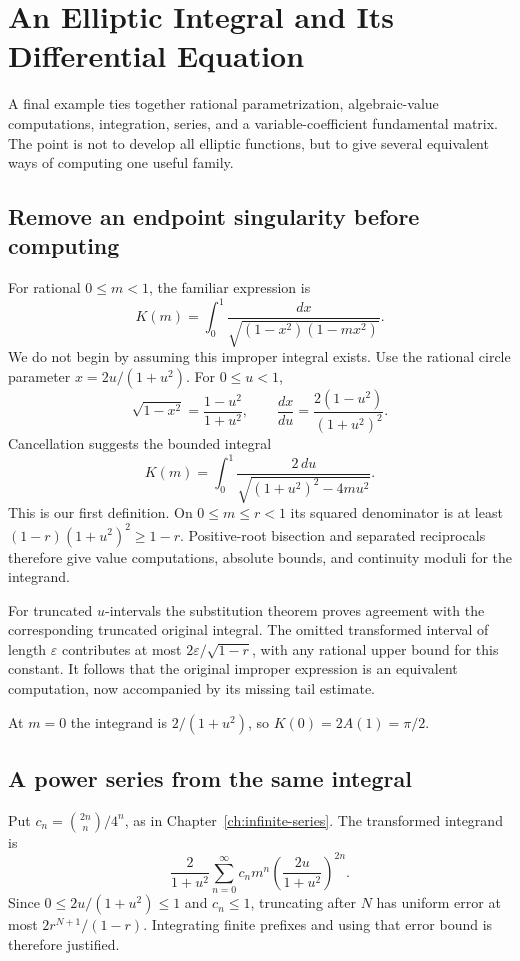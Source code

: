\chapter{An Elliptic Integral and Its Differential Equation}
\label{ch:elliptic}

A final example ties together rational parametrization, algebraic-value
computations, integration, series, and a variable-coefficient fundamental
matrix.  The point is not to develop all elliptic functions, but to give
several equivalent ways of computing one useful family.

\section{Remove an endpoint singularity before computing}
For rational $0\le m<1$, the familiar expression is
\[
 K(m)=\int_0^1\frac{dx}{\sqrt{(1-x^2)(1-mx^2)}}.
\]
We do not begin by assuming this improper integral exists.  Use the rational
circle parameter $x=2u/(1+u^2)$.  For $0\le u<1$,
\[
 \sqrt{1-x^2}=\frac{1-u^2}{1+u^2},\qquad
 \frac{dx}{du}=\frac{2(1-u^2)}{(1+u^2)^2}.
\]
Cancellation suggests the bounded integral
\[
 \boxed{K(m)=\int_0^1
       \frac{2\,du}{\sqrt{(1+u^2)^2-4mu^2}}.}
\]
This is our first definition.  On $0\le m\le r<1$ its squared denominator
is at least $(1-r)(1+u^2)^2\ge1-r$.  Positive-root bisection and separated
reciprocals therefore give value computations, absolute bounds, and
continuity moduli for the integrand.

For truncated $u$-intervals the substitution theorem proves agreement with
the corresponding truncated original integral.  The omitted transformed
interval of length $\varepsilon$ contributes at most
$2\varepsilon/\sqrt{1-r}$, with any rational upper bound for this constant.
It follows that the original improper expression is an equivalent
computation, now accompanied by its missing tail estimate.

At $m=0$ the integrand is $2/(1+u^2)$, so
$K(0)=2A(1)=\pi/2$.

\section{A power series from the same integral}
Put $c_n=\binom{2n}{n}/4^n$, as in
Chapter~\ref{ch:infinite-series}.  The transformed integrand is
\[
 \frac2{1+u^2}\sum_{n=0}^{\infty}
       c_n m^n\left(\frac{2u}{1+u^2}\right)^{2n}.
\]
Since $0\le 2u/(1+u^2)\le1$ and $c_n\le1$, truncating after $N$ has
uniform error at most $2r^{N+1}/(1-r)$.  Integrating finite prefixes and
using that error bound is therefore justified.


